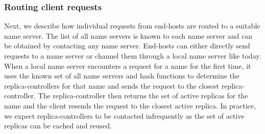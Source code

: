 \vsp
\subsubsection{Routing client requests}

\label{sec:routing_client_requests}

Next, we describe how individual requests from end-hosts are routed to a suitable name server.
The list of all name servers  is known to each name server and can be obtained by contacting any name server. 
End-hosts can either directly send requests to a name server or channel them through a local name server like today. 
When a local name server encounters a request for a name for the first time, it uses the known set of all name servers and hash functions to determine the replica-controllers for that name and sends the request to the closest replica-controller. 
The replica-controller then returns the set of active replicas for the name and the client resends the request to the closest active replica.  In practice, we expect replica-controllers to be contacted infrequently as the set of active replicas can be cached and reused. 









